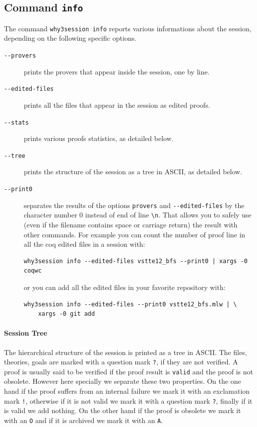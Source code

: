 \subsection{Command \texttt{info}}

The command \texttt{why3session info} reports various informations
about the session, depending on the following specific options.
\begin{description}
\item[\texttt{-{}-provers}] prints the provers that appear inside
  the session, one by line.
\item[\texttt{-{}-edited-files}] prints all the files that appear in
  the session as edited proofs.
\item[\texttt{-{}-stats}] prints various proofs statistics, as
  detailed below.
\item[\texttt{-{}-tree}] prints the structure of the session as a
  tree in ASCII, as detailed below.
\item[\texttt{-{}-print0}] separates the results of the options
  \verb|provers| and \verb|--edited-files| by the character number 0
  instead of end of line \verb|\n|. That allows you to safely use
  (even if the filename contains space or carriage return) the result
  with other commands. For example you can count the number of proof
  line in all the coq edited files in a session with:
\begin{verbatim}
why3session info --edited-files vstte12_bfs --print0 | xargs -0 coqwc
\end{verbatim}
  or you can add all the edited files in your favorite repository
  with:
\begin{verbatim}
why3session info --edited-files --print0 vstte12_bfs.mlw | \
    xargs -0 git add
\end{verbatim}

\end{description}

\paragraph{Session Tree}

The hierarchical structure of the session is printed as a tree in
ASCII. The files, theories, goals are marked with a question mark
\verb|?|, if they are not verified. A proof is usually said to be
verified if the proof result is \verb|valid| and the proof is not
obsolete.
However here specially we separate these two properties. On
the one hand if the proof suffers from an internal failure we mark it
with an exclamation mark \verb|!|, otherwise if it is not valid we
mark it with a question mark \verb|?|, finally if it is valid we add
nothing. On the other hand if the proof is obsolete we mark it with an
\verb|O| and if it is archived we mark it with an \verb|A|.

